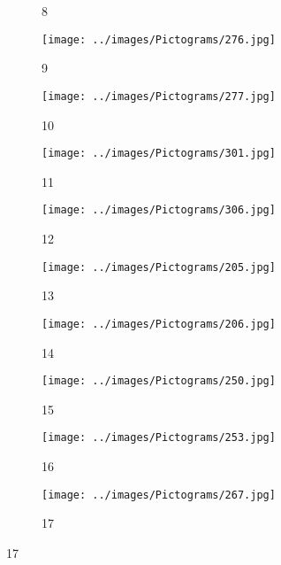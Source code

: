 \begin{figure}[H]
\begin{subfigure}[b]{0.1\textwidth}
		\caption{8}
  \end{subfigure}
  \hspace{3em}%
  \begin{subfigure}[b]{0.1\textwidth}
		\centering
		\texttt{[image: ../images/Pictograms/276.jpg]}
		\caption{9}
  \end{subfigure}
  \hspace{3em}%
  \begin{subfigure}[b]{0.1\textwidth}
		\centering
		\texttt{[image: ../images/Pictograms/277.jpg]}
		\caption{10}
  \end{subfigure}
  \hspace{3em}%
  \begin{subfigure}[b]{0.1\textwidth}
	\centering
	\texttt{[image: ../images/Pictograms/301.jpg]}
	\caption{11}
  \end{subfigure}
  \hspace{3em}%
  \begin{subfigure}[b]{0.1\textwidth}
	  \centering
	  \texttt{[image: ../images/Pictograms/306.jpg]}
	  \caption{12}
  \end{subfigure}
  \hspace{3em}%
  \begin{subfigure}[b]{0.1\textwidth}
	  \centering
	  \texttt{[image: ../images/Pictograms/205.jpg]}
	  \caption{13}
  \end{subfigure}
  \hspace{3em}%
  \begin{subfigure}[b]{0.1\textwidth}
	  \centering
	  \texttt{[image: ../images/Pictograms/206.jpg]}
	  \caption{14}
  \end{subfigure}
  \hspace{3em}%
  \begin{subfigure}[b]{0.1\textwidth}
  \centering
  \texttt{[image: ../images/Pictograms/250.jpg]}
  \caption{15}
  \end{subfigure}
  \hspace{3em}%
  \begin{subfigure}[b]{0.1\textwidth}
	\centering
	\texttt{[image: ../images/Pictograms/253.jpg]}
	\caption{16}
\end{subfigure}
\hspace{3em}%
\begin{subfigure}[b]{0.1\textwidth}
	\centering
	\texttt{[image: ../images/Pictograms/267.jpg]}
	\caption{17}
\end{subfigure}

\end{figure}
